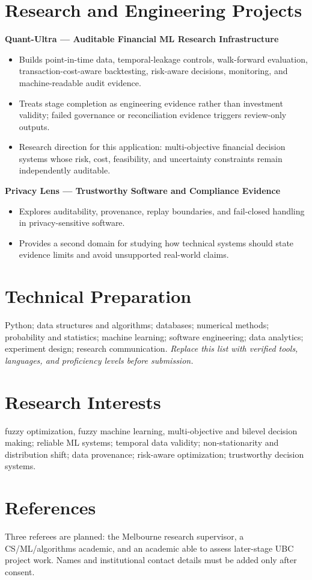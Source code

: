 \documentclass[11pt]{article}
\begin{document}
\section*{Research and Engineering Projects}
\textbf{Quant-Ultra --- Auditable Financial ML Research Infrastructure}
\begin{itemize}
\item Builds point-in-time data, temporal-leakage controls, walk-forward evaluation, transaction-cost-aware backtesting, risk-aware decisions, monitoring, and machine-readable audit evidence.
\item Treats stage completion as engineering evidence rather than investment validity; failed governance or reconciliation evidence triggers review-only outputs.
\item Research direction for this application: multi-objective financial decision systems whose risk, cost, feasibility, and uncertainty constraints remain independently auditable.
\end{itemize}

\begin{samepage}
\textbf{Privacy Lens --- Trustworthy Software and Compliance Evidence}
\begin{itemize}
\item Explores auditability, provenance, replay boundaries, and fail-closed handling in privacy-sensitive software.
\item Provides a second domain for studying how technical systems should state evidence limits and avoid unsupported real-world claims.
\end{itemize}
\end{samepage}

\section*{Technical Preparation}
Python; data structures and algorithms; databases; numerical methods; probability and statistics; machine learning; software engineering; data analytics; experiment design; research communication. \textit{Replace this list with verified tools, languages, and proficiency levels before submission.}

\section*{Research Interests}
fuzzy optimization, fuzzy machine learning, multi-objective and bilevel decision making; reliable ML systems; temporal data validity; non-stationarity and distribution shift; data provenance; risk-aware optimization; trustworthy decision systems.

\section*{References}
Three referees are planned: the Melbourne research supervisor, a CS/ML/algorithms academic, and an academic able to assess later-stage UBC project work. Names and institutional contact details must be added only after consent.
\end{document}
